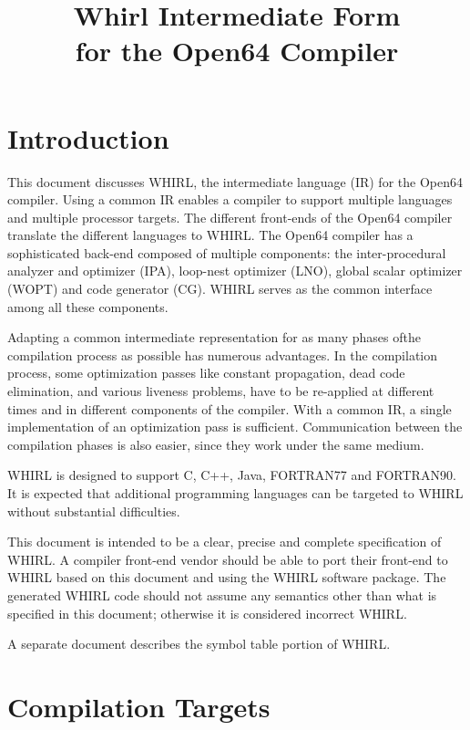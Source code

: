 \documentclass{article}
\begin{document}
\title{Whirl Intermediate Form\\ for the Open64 Compiler}
\maketitle
\clearpage

\tableofcontents
\clearpage

\section{Introduction}

This document discusses WHIRL, the intermediate language (IR) for
the Open64 compiler. Using a common IR enables a compiler to
support multiple languages and multiple processor targets. The
different front-ends of the Open64 compiler translate the different
languages to WHIRL. The Open64 compiler has a sophisticated back-end
composed of multiple components: the inter-procedural analyzer and
optimizer (IPA), loop-nest optimizer (LNO), global scalar optimizer
(WOPT) and code generator (CG). WHIRL serves as the common interface
among all these components. 

Adapting a common intermediate
representation for as many phases ofthe compilation process as
possible has numerous advantages. In the compilation process, some
optimization passes like constant propagation, dead code elimination,
and various liveness problems, have to be re-applied at different
times and in different components of the compiler. With a common
IR, a single implementation of an optimization pass is sufficient.
Communication between the compilation phases is also easier, since they work 
under the same medium.

WHIRL is designed to support C, C++, Java, FORTRAN77 and FORTRAN90.
It is expected that additional programming languages can be targeted
to WHIRL without substantial difficulties. 

This document is intended
to be a clear, precise and complete specification of WHIRL. A
compiler front-end vendor should be able to port their front-end
to WHIRL based on this document and using the WHIRL software
package. The generated WHIRL code should not assume any semantics
other than what is specified in this document; otherwise it
is considered incorrect WHIRL.

A separate document describes the symbol table portion of WHIRL.

\section{Compilation Targets}
\end{document}
